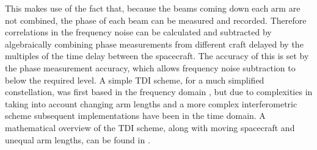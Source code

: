 \documentclass{article}
\begin{document}
This makes use of the fact that, because the beams coming down each arm are not
combined, the phase of each beam can be measured and recorded. Therefore
correlations in the frequency noise can be calculated and subtracted by
algebraically combining phase measurements from different craft delayed by the
multiples of the time delay between the spacecraft. The accuracy of this is set
by the phase measurement accuracy, which allows frequency noise subtraction to
below the required level. A simple TDI scheme, for a much simplified
constellation, was first based in the frequency domain \cite{Giampieri}, but due
to complexities in taking into account changing arm lengths and a more complex
interferometric scheme subsequent implementations have been in the time domain.
A mathematical overview of the TDI scheme, along with moving spacecraft and
unequal arm lengths, can be found in \cite{Tinto:2005}.
\end{document}
